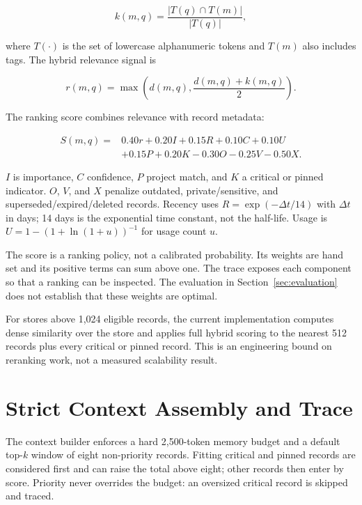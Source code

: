 \documentclass[11pt]{article}
\begin{document}
\begin{equation}
k(m,q) = \frac{|T(q)\cap T(m)|}{|T(q)|},
\end{equation}

where $T(\cdot)$ is the set of lowercase alphanumeric tokens and $T(m)$ also
includes tags. The hybrid relevance signal is

\begin{equation}
r(m,q) = \max\left(d(m,q),\frac{d(m,q)+k(m,q)}{2}\right).
\end{equation}

The ranking score combines relevance with record metadata:

\begin{equation}
\label{eq:score}
\begin{aligned}
S(m,q) ={}& 0.40r + 0.20I + 0.15R + 0.10C + 0.10U \\
          & + 0.15P + 0.20K - 0.30O - 0.25V - 0.50X.
\end{aligned}
\end{equation}

$I$ is importance, $C$ confidence, $P$ project match, and $K$ a critical or
pinned indicator. $O$, $V$, and $X$ penalize outdated, private/sensitive, and
superseded/expired/deleted records. Recency uses
$R=\exp(-\Delta t/14)$ with $\Delta t$ in days; 14 days is the exponential
time constant, not the half-life. Usage is
$U=1-(1+\ln(1+u))^{-1}$ for usage count $u$.

The score is a ranking policy, not a calibrated probability. Its weights are
hand set and its positive terms can sum above one. The trace exposes each
component so that a ranking can be inspected. The evaluation in
Section~\ref{sec:evaluation} does not establish that these weights are optimal.

For stores above 1,024 eligible records, the current implementation computes
dense similarity over the store and applies full hybrid scoring to the nearest
512 records plus every critical or pinned record. This is an engineering bound
on reranking work, not a measured scalability result.

\section{Strict Context Assembly and Trace}
\label{sec:budget}

The context builder enforces a hard 2,500-token memory budget and a default
top-$k$ window of eight non-priority records. Fitting critical and pinned
records are considered first and can raise the total above eight; other records
then enter by score. Priority never overrides the budget: an oversized critical
record is skipped and traced.
\end{document}
